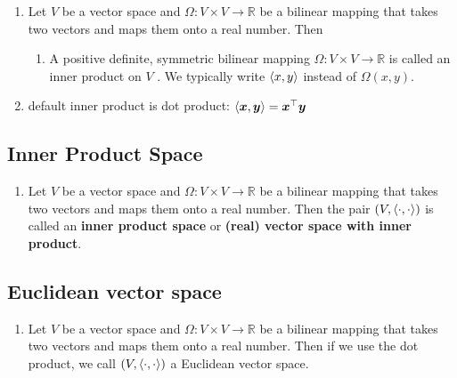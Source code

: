 \begin{enumerate}
    \item Let $V$ be a vector space and $\Omega  : V \times  V \to  \mathbb{R}$ be a bilinear mapping that takes two vectors and maps them onto a real number. Then
    \hfill \cite{mfml/book/mml/Deisenroth-Faisal-Ong}
    \begin{enumerate}
        \item A positive definite, symmetric bilinear mapping $\Omega  : V \times  V \to  \mathbb{R}$ is called an inner product on $V$ . 
        We typically write $\langle x, y\rangle$ instead of $\Omega (x, y)$.        
        \hfill \cite{mfml/book/mml/Deisenroth-Faisal-Ong}
    \end{enumerate}

    \item default inner product is dot product: $\langle\bm{x}, \bm{y}\rangle = \bm{x}^\top \bm{y}$
    \hfill \cite{mfml/book/mml/Deisenroth-Faisal-Ong}
\end{enumerate}







\subsection{Inner Product Space}

\begin{enumerate}
    \item Let $V$ be a vector space and $\Omega  : V \times  V \to  \mathbb{R}$ be a bilinear mapping that takes two vectors and maps them onto a real number. 
    Then the pair $(V, \langle\cdot, \cdot\rangle)$ is called an \textbf{inner product space} or \textbf{(real) vector space with inner product}.
\end{enumerate}




\subsection{Euclidean vector space}

\begin{enumerate}
    \item Let $V$ be a vector space and $\Omega : V \times V \to \mathbb{R}$ be a bilinear mapping that takes two vectors and maps them onto a real number. Then if we use the dot product, we call $(V,\langle\cdot, \cdot\rangle)$ a Euclidean vector space.
\end{enumerate}



